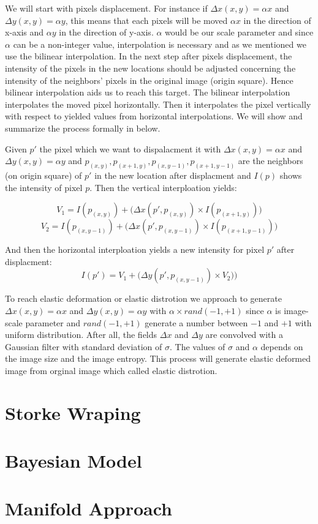 We will start with pixels displacement. For instance if $\Delta x(x,y)= \alpha x$ and $\Delta y(x,y)= \alpha y$, this means that each pixels will be moved $\alpha x$ in the direction of x-axis and
$\alpha y$ in the direction of y-axis. $\alpha$ would be our scale parameter and since $\alpha$ can be a non-integer value, interpolation is necessary and as we mentioned we use the bilinear
interpolation.  In the next step after pixels displacement, the intensity of the pixels in the new locations should be adjusted concerning the intensity of the neighbors' pixels in the original image
(origin square). Hence bilinear interpolation aids us to reach this target. The bilinear interpolation interpolates the moved pixel horizontally. Then it interpolates the pixel vertically with respect
to yielded values from horizontal interpolations. We will show and summarize the process formally in below.

\begin{definition}{}
  Given $p'$ the pixel which we want to dispalacment it with $\Delta x(x,y)= \alpha x$ and $\Delta y(x,y)= \alpha y$ and $p_{(x,y)}, p_{(x+1,y)}, p_{(x,y-1)}, p_{(x+1,y-1)}$ are the neighbors (on
  origin square) of $p'$ in the new location after displacment and $I(p)$ shows the intensity of pixel $p$. Then the vertical interploation yields:

  $$V_1 = I(p_{(x,y)}) + \big( \Delta x(p', p_{(x,y)}) \times I(p_{(x+1,y)}) \big)$$
  $$V_2 = I(p_{(x,y-1)}) + \big( \Delta x(p', p_{(x,y-1)}) \times I(p_{(x+1,y-1)}) \big)$$

  And then the horizontal interploation yields a new intensity for pixel $p'$ after displacment:
  $$I(p') = V_1 + \big( \Delta y(p', p_{(x,y-1)}) \times V_2) \big)$$
\end{definition}

To reach elastic deformation or elastic distrotion we approach to generate $\Delta x(x,y)= \alpha x$ and $\Delta y(x,y)= \alpha y$ with $\alpha \times rand(-1,+1)$ since $\alpha$ is image-scale parameter
and $rand(-1,+1)$ generate a number between $-1$ and $+1$ with uniform distribution. After all, the
fields $\Delta x$ and $\Delta y$ are convolved with a Gaussian filter with standard deviation of
$\sigma$. The values of $\sigma$ and $\alpha$ depends on the image size and the image entropy. This process will generate elastic deformed image from orginal image which called elastic distrotion.


\section{Storke Wraping}
\label{tit:storke-wraping}

\section{Bayesian Model}
\label{tit:bayesian-model}




\section{Manifold Approach}
\label{tit:manifold-approach}
